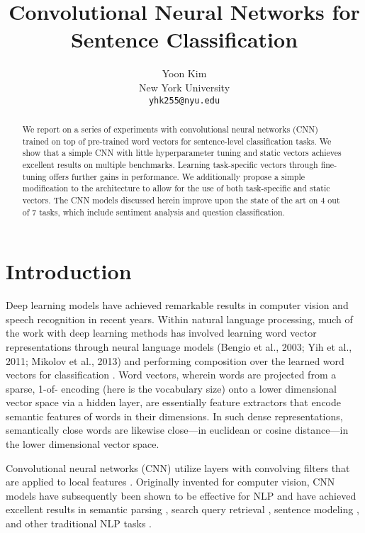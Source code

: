 \documentclass[11pt]{article}
\title{Convolutional Neural Networks for Sentence Classification}
\author{Yoon Kim \\ New York University \\ {\tt yhk255@nyu.edu}}
\date{}
\begin{document}
\maketitle
\begin{abstract}
We report on a series of experiments with convolutional neural networks (CNN) trained on top of pre-trained word vectors for sentence-level classification tasks. We show that a simple CNN with little hyperparameter tuning and static vectors achieves excellent results on multiple benchmarks. Learning task-specific vectors through fine-tuning offers further gains in performance. We additionally propose a simple modification to the architecture to allow for the use of both task-specific and static vectors. The CNN models discussed herein improve upon the state of the art on 4 out of 7 tasks, which include sentiment analysis and question classification.
\end{abstract}

\section{Introduction}
Deep learning models have achieved remarkable results in computer vision \cite{Krizhevsky:2012} and speech recognition \cite{Graves:2013} in recent years. Within natural language processing, much of the  work with deep learning methods has involved learning word vector representations through neural language models (Bengio et al., 2003; Yih et al., 2011; Mikolov et al., 2013) and performing composition over the learned word vectors for classification \cite{Collobert:2011}. Word vectors, wherein words are projected from a sparse, 1-of- encoding (here  is the vocabulary size) onto a lower dimensional vector space via a hidden layer, are essentially feature extractors that encode semantic features of words in their  dimensions. In such dense representations, semantically close words are likewise close---in euclidean or cosine distance---in the lower dimensional vector space.

Convolutional neural networks (CNN) utilize layers with convolving filters that are applied to local features \cite{LeCun:1998}. Originally invented for computer vision, CNN models have subsequently been shown to be effective for NLP and have achieved excellent results in semantic parsing \cite{Yih:2014}, search query retrieval \cite{Shen:2014}, sentence modeling \cite{Kalch:2014}, and other traditional NLP tasks \cite{Collobert:2011}. 
\end{document}
